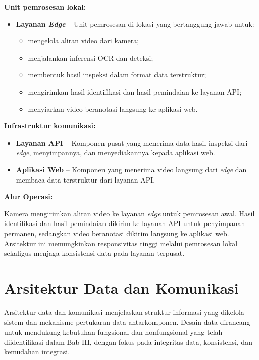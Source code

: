 \textbf{Unit pemrosesan lokal:}

\begin{itemize}
  \item \textbf{Layanan \textit{Edge}} -- Unit pemrosesan di lokasi yang bertanggung jawab untuk:
  \begin{itemize}
    \item mengelola aliran video dari kamera;
    \item menjalankan inferensi OCR dan deteksi;
    \item membentuk hasil inspeksi dalam format data terstruktur;
    \item mengirimkan hasil identifikasi dan hasil pemindaian ke layanan API;
    \item menyiarkan video beranotasi langsung ke aplikasi web.
  \end{itemize}
\end{itemize}

\textbf{Infrastruktur komunikasi:}

\begin{itemize}
  \item \textbf{Layanan API} -- Komponen pusat yang menerima data hasil inspeksi dari \textit{edge}, menyimpannya, dan menyediakannya kepada aplikasi web.
  \item \textbf{Aplikasi Web} -- Komponen yang menerima video langsung dari \textit{edge} dan membaca data terstruktur dari layanan API.
\end{itemize}

\textbf{Alur Operasi:}

Kamera mengirimkan aliran video ke layanan \textit{edge} untuk pemrosesan awal. Hasil identifikasi dan hasil pemindaian dikirim ke layanan API untuk penyimpanan permanen, sedangkan video beranotasi dikirim langsung ke aplikasi web. Arsitektur ini memungkinkan responsivitas tinggi melalui pemrosesan lokal sekaligus menjaga konsistensi data pada layanan terpusat.

\section{Arsitektur Data dan Komunikasi}

Arsitektur data dan komunikasi menjelaskan struktur informasi yang dikelola sistem dan mekanisme pertukaran data antarkomponen. Desain data dirancang untuk mendukung kebutuhan fungsional dan nonfungsional yang telah diidentifikasi dalam Bab III, dengan fokus pada integritas data, konsistensi, dan kemudahan integrasi.

